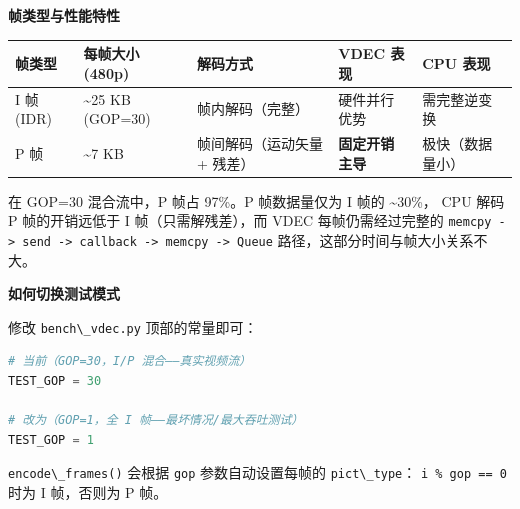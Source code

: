 \textbf{帧类型与性能特性}

\begin{longtable}[]{@{}
  >{\raggedright\arraybackslash}p{}
  >{\raggedright\arraybackslash}p{}
  >{\raggedright\arraybackslash}p{}
  >{\raggedright\arraybackslash}p{}
  >{\raggedright\arraybackslash}p{}@{}}
\toprule\noalign{}
\begin{minipage}[b]{\linewidth}\raggedright
帧类型
\end{minipage} & \begin{minipage}[b]{\linewidth}\raggedright
每帧大小 (480p)
\end{minipage} & \begin{minipage}[b]{\linewidth}\raggedright
解码方式
\end{minipage} & \begin{minipage}[b]{\linewidth}\raggedright
VDEC 表现
\end{minipage} & \begin{minipage}[b]{\linewidth}\raggedright
CPU 表现
\end{minipage} \\
\midrule\noalign{}
\endhead
\bottomrule\noalign{}
\endlastfoot
I 帧 (IDR) & \textasciitilde25 KB (GOP=30) & 帧内解码（完整） &
硬件并行优势 & 需完整逆变换 \\
P 帧 & \textasciitilde7 KB & 帧间解码（运动矢量 + 残差） &
\textbf{固定开销主导} & 极快（数据量小） \\
\end{longtable}

在 GOP=30 混合流中，P 帧占 97\%。P 帧数据量仅为 I 帧的
\textasciitilde30\%， CPU 解码 P 帧的开销远低于 I 帧（只需解残差），而
VDEC 每帧仍需经过完整的
\passthrough{\lstinline!memcpy -> send -> callback -> memcpy -> Queue!}
路径，这部分时间与帧大小关系不大。

\textbf{如何切换测试模式}

修改 \passthrough{\lstinline!bench\_vdec.py!} 顶部的常量即可：

\begin{lstlisting}[language=Python]
# 当前（GOP=30，I/P 混合——真实视频流）
TEST_GOP = 30

# 改为（GOP=1，全 I 帧——最坏情况/最大吞吐测试）
TEST_GOP = 1
\end{lstlisting}

\passthrough{\lstinline!encode\_frames()!} 会根据
\passthrough{\lstinline!gop!} 参数自动设置每帧的
\passthrough{\lstinline!pict\_type!}：
\passthrough{\lstinline!i \% gop == 0!} 时为 I 帧，否则为 P 帧。

